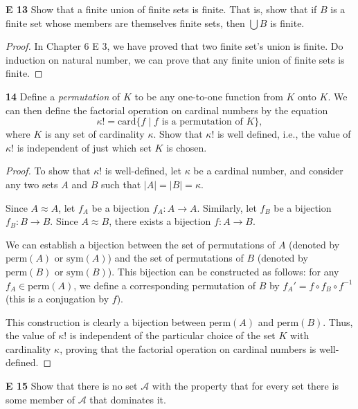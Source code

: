\begin{question}
    \textbf{E 13}
    Show that a finite union of finite sets is finite. That is, show that if \(B\) is a finite set whose members are themselves finite sets, then \(\bigcup B\) is finite.
\end{question}
\begin{proof}
    In Chapter 6 E 3, we have proved that two finite set's union is finite. Do induction on natural number, we can prove that any finite union of finite sets is finite.
\end{proof}
\begin{question}
    \textbf{14}
    Define a \textit{permutation} of \(K\) to be any one-to-one function from \(K\) onto \(K\). We can then define the factorial operation on cardinal numbers by the equation
    \[
    \kappa! = \text{card} \{ f \mid f \text{ is a permutation of } K \},
    \]
    where \(K\) is any set of cardinality \(\kappa\). Show that \(\kappa!\) is well defined, i.e., the value of \(\kappa!\) is independent of just which set \(K\) is chosen.

\end{question}
\begin{proof}
    To show that \(\kappa!\) is well-defined, let \(\kappa\) be a cardinal number, and consider any two sets \(A\) and \(B\) such that \(|A| = |B| = \kappa\).

    Since \(A \approx A\), let \(f_A\) be a bijection \(f_A: A \rightarrow A\). Similarly, let \(f_B\) be a bijection \(f_B: B \rightarrow B\). Since \(A \approx B\), there exists a bijection \(f: A \rightarrow B\).

    We can establish a bijection between the set of permutations of \(A\) (denoted by \(\mathrm{perm}(A)\) or \(\mathrm{sym}(A)\)) and the set of permutations of \(B\) (denoted by \(\mathrm{perm}(B)\) or \(\mathrm{sym}(B)\)). This bijection can be constructed as follows: for any \(f_A \in \mathrm{perm}(A)\), we define a corresponding permutation of \(B\) by \(f_A' = f \circ f_B \circ f^{-1}\) (this is a conjugation by \(f\)).

    This construction is clearly a bijection between \(\mathrm{perm}(A)\) and \(\mathrm{perm}(B)\). Thus, the value of \(\kappa!\) is independent of the particular choice of the set \(K\) with cardinality \(\kappa\), proving that the factorial operation on cardinal numbers is well-defined.
\end{proof}
\begin{question}
    \textbf{E 15}
    Show that there is no set \(\mathcal{A}\) with the property that for every set there is some member of \(\mathcal{A}\) that dominates it.
\end{question}

